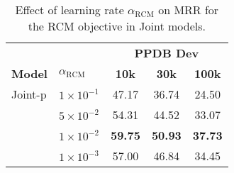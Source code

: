 \documentclass[11pt]{article}
\begin{document}
\iffalse
\begin{figure}[!h]%
\texttt{[image: MRR\_wordnet.png]}
\caption{Performances of learned embeddings on WordNet synonym test data}
\label{fig:curve_mrr_wordnet}
\end{figure}
\fi

\begin{table}[!h]
\small
\centering
	\begin{tabular}{|l|l|c|c|c|}
	\hline
	 & &  \multicolumn{3}{|c|}{\bf PPDB Dev } \\
	\cline{3-5}
	{\bf Model} & $\alpha_{\textrm{RCM}}$ & \bf 10k & \bf 30k & \bf 100k \\
	\hline
         Joint-p & $1 \times 10^{-1}$ & 47.17 & 36.74  &  24.50  \\ 
	& $5 \times 10^{-2}$ & 54.31 & 44.52 & 33.07 \\
	& $1 \times 10^{-2}$ & \bf 59.75 & \bf 50.93 & \bf 37.73  \\
	& $1 \times 10^{-3}$ & 57.00 & 46.84 & 34.45  \\
	\hline
	\end{tabular}
\caption{Effect of learning rate $\alpha_{\textrm{RCM}}$ on MRR for the RCM objective in Joint models.}
\label{tab:res_ppdb_learningrate}
\end{table}
\end{document}
